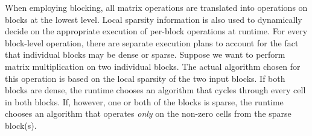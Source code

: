 
When employing blocking, all matrix operations are translated into operations on blocks at the lowest level. Local sparsity information is also used to dynamically decide on the appropriate execution of per-block operations at runtime. For every block-level operation, there are separate execution plans to account for the fact that individual blocks may be dense or sparse. Suppose we want to perform matrix multiplication on two individual blocks. The actual algorithm chosen for this operation is based on the local sparsity of the two input blocks. If both blocks are dense, the runtime chooses an algorithm that cycles through every cell in both blocks. If, however, one or both of the blocks is sparse, the runtime chooses an algorithm that operates {\em only} on the non-zero cells from the sparse block(s). 







